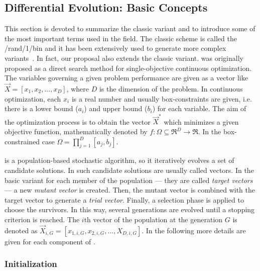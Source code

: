 \subsection{Differential Evolution: Basic Concepts}

This section is devoted to summarize the classic \DE{} variant and to introduce some of the most important terms used in the \DE{} field.
%
The classic \DE{} scheme is called the \DE{}/rand/1/bin and it has been extensively used to generate more complex \DE{} variants~\cite{das2011differential}.
%
In fact, our proposal also extends the classic variant.
%
%
\DE{} was originally proposed as a direct search method for single-objective continuous optimization.
%
The variables governing a given problem performance are given as a vector like $\vec{X} = [x_1, x_2, ..., x_D]$, where $D$ is the
dimension of the problem.
%
In continuous optimization, each $x_i$ is a real number and usually box-constraints are given, i.e. there is a lower bound ($a_{i}$) and
upper bound ($b_{i}$) for each variable.
%
The aim of the optimization process is to obtain the vector $\vec{X}^*$ which minimizes a given objective function, mathematically 
denoted by $f : \Omega \subseteq \Re^D \rightarrow \Re$.
%
In the box-constrained case $\Omega = {\prod}_{j=1}^{D} [a_{j}, b_{j}]$.

\DE{} is a population-based stochastic algorithm, so it iteratively evolves a set of candidate solutions.
%
In \DE{} such candidate solutions are usually called vectors.
%
In the basic \DE{} variant for each member of the population --- they are called \textit{target vectors} --- a new \textit{mutant vector}
is created.
%
Then, the mutant vector is combined with the target vector to generate a \textit{trial vector}.
%
Finally, a selection phase is applied to choose the survivors.
%
In this way, several generations are evolved until a stopping criterion is reached.
%
The $i$th vector of the population at the generation $G$ is denoted as $\vec{X}_{i,G} = [x_{1,i,G}, x_{2,i,G},..., X_{D,i, G}]$.
%
In the following more details are given for each component of \DE{}.


\subsubsection{Initialization}


